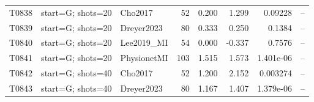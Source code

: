 \begin{longtable}{p{.45in}p{2.6in}p{.75in}rrrrr}
T0838 & start=G; shots=20 & Cho2017 & 52 & 0.200 & 1.299 & 0.09228 & -- \\
T0839 & start=G; shots=20 & Dreyer2023 & 80 & 0.333 & 0.250 & 0.1384 & -- \\
T0840 & start=G; shots=20 & Lee2019\_\allowbreak{}MI & 54 & 0.000 & -0.337 & 0.7576 & -- \\
T0841 & start=G; shots=20 & PhysionetMI & 103 & 1.515 & 1.573 & 1.401e-06 & -- \\
T0842 & start=G; shots=40 & Cho2017 & 52 & 1.200 & 2.152 & 0.003274 & -- \\
T0843 & start=G; shots=40 & Dreyer2023 & 80 & 1.167 & 1.407 & 1.379e-06 & -- \\
\bottomrule
\end{longtable}
